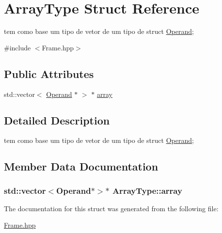 \hypertarget{struct_array_type}{}\section{Array\+Type Struct Reference}
\label{struct_array_type}


tem como base um tipo de vetor de um tipo de struct \hyperlink{struct_operand}{Operand};  




{\ttfamily \#include $<$Frame.\+hpp$>$}

\subsection*{Public Attributes}
\begin{DoxyCompactItemize}
\item 
std\+::vector$<$ \hyperlink{struct_operand}{Operand} $\ast$ $>$ $\ast$ \hyperlink{struct_array_type_a26ce491115f4a9ecad8e6315b9ffd447}{array}
\end{DoxyCompactItemize}


\subsection{Detailed Description}
tem como base um tipo de vetor de um tipo de struct \hyperlink{struct_operand}{Operand}; 

\subsection{Member Data Documentation}
\subsubsection[{\texorpdfstring{array}{array}}]{\setlength{\rightskip}{0pt plus 5cm}std\+::vector$<${\bf Operand}$\ast$$>$$\ast$ Array\+Type\+::array}\hypertarget{struct_array_type_a26ce491115f4a9ecad8e6315b9ffd447}{}\label{struct_array_type_a26ce491115f4a9ecad8e6315b9ffd447}


The documentation for this struct was generated from the following file\+:\begin{DoxyCompactItemize}
\item 
\hyperlink{_frame_8hpp}{Frame.\+hpp}\end{DoxyCompactItemize}
